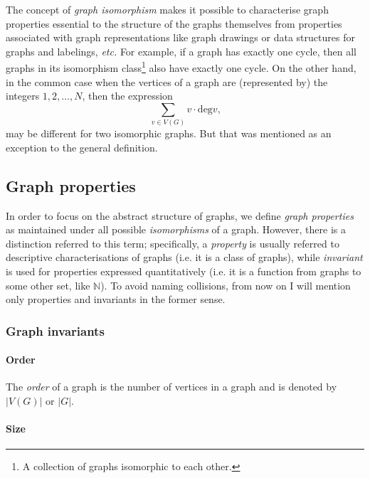       The concept of \emph{graph isomorphism} makes it possible to characterise graph properties essential to the structure of the graphs themselves from properties associated with graph representations like graph drawings or data structures for graphs and labelings, \emph{etc.} For example, if a graph has exactly one cycle, then all graphs in its isomorphism class\footnote{A collection of graphs isomorphic to each other.} also have exactly one cycle. On the other hand, in the common case when the vertices of a graph are (represented by) the integers $1, 2, \ldots, N$, then the expression
      \begin{equation}
        \sum_{v \in V(G)} v\cdot\mbox{deg} v\mbox{,}
      \end{equation}
      may be different for two isomorphic graphs. But that was mentioned as an exception to the general definition.

    \subsection{Graph properties}

      In order to focus on the abstract structure of graphs, we define \emph{graph properties} as maintained under all possible \emph{isomorphisms} of a graph. However, there is a distinction referred to this term; specifically, a \emph{property} is usually referred to descriptive characterisations of graphs (i.e. it is a class of graphs), while \emph{invariant} is used for properties expressed quantitatively (i.e. it is a function from graphs to some other set, like $\mathbb{N}$). To avoid naming collisions, from now on I will mention only properties and invariants in the former sense. 

      \subsubsection{Graph invariants}

        \paragraph{Order}

          The \emph{order} of a graph is the number of vertices in a graph and is denoted by $|V(G)|$ or $|G|$.
            
        \paragraph{Size}

